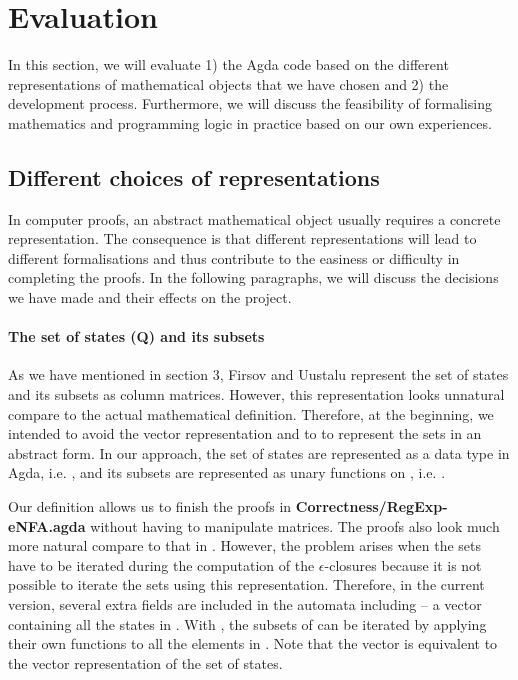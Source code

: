 \section{Evaluation}
\par In this section, we will evaluate 1) the Agda code based on the
different representations of mathematical objects that we have chosen and 2) the
development process. Furthermore, we will discuss the feasibility of
formalising mathematics and programming logic in practice based on our own experiences. 


\subsection{Different choices of representations}
\par In computer proofs, an abstract mathematical
object usually requires a concrete representation. The consequence is that different representations will lead to different
formalisations and thus contribute to the
easiness or difficulty in completing the proofs. In the
following paragraphs, we will discuss the decisions we have made and
their effects on the project. 

\paragraph{The set of states (Q) and its subsets} As we have mentioned in section 3, Firsov and Uustalu
\cite{firsov2013} represent the set of states  and its subsets
as column matrices. However, this representation looks unnatural compare
to the actual mathematical definition. Therefore, at the beginning, we intended to avoid the vector representation and to
to represent the sets in an abstract form. In our approach, the set of states are represented as a data type in Agda, i.e. , and its
subsets are represented as unary functions on , i.e. . 

\par Our definition allows us to finish the proofs in
\textbf{Correctness/RegExp-eNFA.agda} without having to
manipulate matrices. The proofs also look much more natural compare to that in
\cite{firsov2013}. However, the problem arises when the sets have to be iterated during the computation of the 
\(\epsilon\)-closures because it is not
possible to iterate the sets using this representation. Therefore, in the
current version, several extra fields are included in the automata
including  -- a vector containing all the states in . With , the subsets
of  can be iterated by applying their own functions  to all the elements in . Note that the
vector  is equivalent to the vector representation of the set of
states. 

